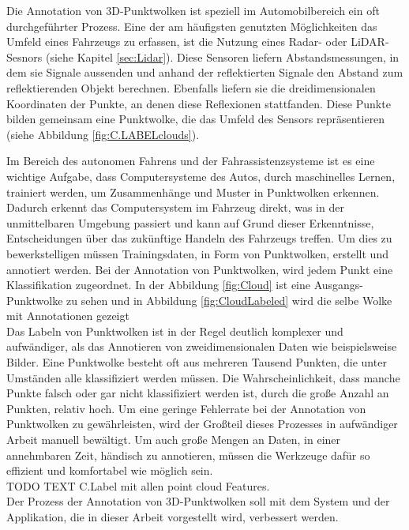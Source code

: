 Die Annotation von 3D-Punktwolken ist speziell im Automobilbereich ein oft durchgeführter Prozess. Eine der am häufigsten genutzten Möglichkeiten das Umfeld eines Fahrzeugs zu erfassen, ist die Nutzung eines Radar- oder LiDAR-Sesnors (siehe Kapitel \ref{sec:Lidar}). Diese Sensoren liefern Abstandsmessungen, in dem sie Signale aussenden und anhand der reflektierten Signale den Abstand zum reflektierenden Objekt berechnen. Ebenfalls liefern sie die dreidimensionalen Koordinaten der Punkte, an denen diese Reflexionen stattfanden. Diese Punkte bilden gemeinsam eine Punktwolke, die das Umfeld des Sensors repräsentieren (siehe Abbildung \ref{fig:C.LABELclouds}). 

Im Bereich des autonomen Fahrens und der Fahrassistenzsysteme ist es eine wichtige Aufgabe, dass Computersysteme des Autos, durch maschinelles Lernen, trainiert werden, um Zusammenhänge und Muster in Punktwolken erkennen. Dadurch erkennt das Computersystem im Fahrzeug direkt, was in der unmittelbaren Umgebung passiert und kann auf Grund dieser Erkenntnisse, Entscheidungen über das zukünftige Handeln des Fahrzeugs treffen. Um dies zu bewerkstelligen müssen Trainingsdaten, in Form von Punktwolken, erstellt und annotiert werden. Bei der Annotation von Punktwolken, wird jedem Punkt eine Klassifikation zugeordnet. In der Abbildung \ref{fig:Cloud} ist eine Ausgangs-Punktwolke zu sehen und in Abbildung \ref{fig:CloudLabeled} wird die selbe Wolke mit Annotationen gezeigt\\

Das Labeln von Punktwolken ist in der Regel deutlich komplexer und aufwändiger, als das Annotieren von zweidimensionalen Daten wie beispielsweise Bilder. Eine Punktwolke besteht oft aus mehreren Tausend Punkten, die unter Umständen alle klassifiziert werden müssen. Die Wahrscheinlichkeit, dass manche Punkte falsch oder gar nicht klassifiziert werden ist, durch die große Anzahl an Punkten, relativ hoch. Um eine geringe Fehlerrate bei der Annotation von Punktwolken zu gewährleisten, wird der Großteil dieses Prozesses in aufwändiger Arbeit manuell bewältigt. Um auch große Mengen an Daten, in einer annehmbaren Zeit, händisch zu annotieren, müssen die Werkzeuge dafür so effizient und komfortabel wie möglich sein.\\

TODO TEXT C.Label mit allen point cloud Features.\\

Der Prozess der Annotation von 3D-Punktwolken soll mit dem System und der Applikation, die in dieser Arbeit vorgestellt wird, verbessert werden.


